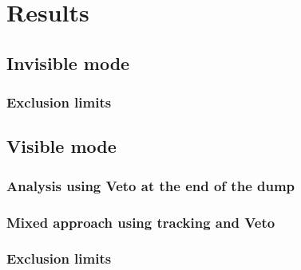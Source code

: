 
\chapter{Results} %

\label{chapter4} %


\section{Invisible mode}
\label{chapter4:sec:invis-mode}

\subsection{Exclusion limits}
\label{chapter4:sec:invis-mode-elimits}

\section{Visible mode}
\label{chapter4:sec:vis-mode}

\subsection{Analysis using Veto at the end of the dump}
\label{chapter4:sec:vis-mode-veto}

\subsection{Mixed approach using tracking and Veto}
\label{chapter4:sec:vis-mode-tracking}

\subsection{Exclusion limits}
\label{chapter4:sec:vis-mode-elimits}
